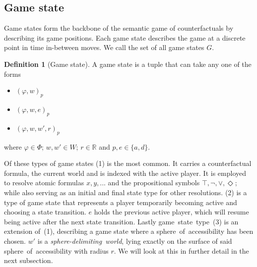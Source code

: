 \documentclass[a4paper,american]{paper}
\theoremstyle{definition}\newtheorem{definition}{Definition}
\begin{document}
\subsection{Game state}
Game states form the backbone of the semantic game of counterfactuals by describing its game positions. Each game state describes the game at a discrete point in time in-between moves. We call the set of all game states $G$.
\begin{definition}[Game state]
A game state is a tuple that can take any one of the forms
\begin{itemize}
	\item[(1)] $(\varphi ,w)_p$
	\item[(2)] $(\varphi ,w, e)_p$
	\item[(3)] $(\varphi ,w,w',r)_p$
\end{itemize}
where $\varphi\in\Phi$; $w,w'\in W$; $r\in\mathbb{R}$ and $p,e\in\{ a,d\}$.
\end{definition}
\noindent Of these types of game states (1) is the most common. It carries a counterfactual formula, the current world and is indexed with the active player. It is employed to resolve atomic formulas $x,y,...$ and the propositional symbols $\top,\neg,\vee,\Diamond$; while also serving as an initial and final state type for other resolutions. (2) is a type of game state that represents a player temporarily becoming active and choosing a state transition. $e$ holds the previous active player, which will resume being active after the next state transition. Lastly game~state~type~(3) is an extension of~(1), describing a game state where a sphere~of~accessibility has been chosen. $w'$ is a \textit{sphere-delimiting~world}, lying exactly on the surface of said sphere~of~accessibility with radius $r$. We will look at this in further detail in the next subsection.\\
\end{document}
